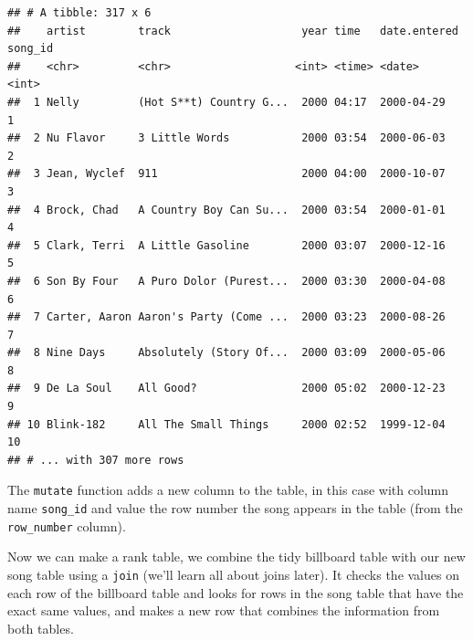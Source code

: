 \documentclass[12pt,]{book}
\newenvironment{Shaded}{\begin{snugshade}}{\end{snugshade}}
\newcommand{\KeywordTok}[1]{\textcolor[rgb]{0.13,0.29,0.53}{\textbf{#1}}}
\newcommand{\StringTok}[1]{\textcolor[rgb]{0.31,0.60,0.02}{#1}}
\newcommand{\OperatorTok}[1]{\textcolor[rgb]{0.81,0.36,0.00}{\textbf{#1}}}
\newcommand{\NormalTok}[1]{#1}
\theoremstyle{definition}
\theoremstyle{definition}
\theoremstyle{definition}
\theoremstyle{remark}
\begin{document}
\begin{verbatim}
## # A tibble: 317 x 6
##    artist        track                    year time   date.entered song_id
##    <chr>         <chr>                   <int> <time> <date>         <int>
##  1 Nelly         (Hot S**t) Country G...  2000 04:17  2000-04-29         1
##  2 Nu Flavor     3 Little Words           2000 03:54  2000-06-03         2
##  3 Jean, Wyclef  911                      2000 04:00  2000-10-07         3
##  4 Brock, Chad   A Country Boy Can Su...  2000 03:54  2000-01-01         4
##  5 Clark, Terri  A Little Gasoline        2000 03:07  2000-12-16         5
##  6 Son By Four   A Puro Dolor (Purest...  2000 03:30  2000-04-08         6
##  7 Carter, Aaron Aaron's Party (Come ...  2000 03:23  2000-08-26         7
##  8 Nine Days     Absolutely (Story Of...  2000 03:09  2000-05-06         8
##  9 De La Soul    All Good?                2000 05:02  2000-12-23         9
## 10 Blink-182     All The Small Things     2000 02:52  1999-12-04        10
## # ... with 307 more rows
\end{verbatim}

The \texttt{mutate} function adds a new column to the table, in this
case with column name \texttt{song\_id} and value the row number the
song appears in the table (from the \texttt{row\_number} column).

Now we can make a rank table, we combine the tidy billboard table with
our new song table using a \texttt{join} (we'll learn all about joins
later). It checks the values on each row of the billboard table and
looks for rows in the song table that have the exact same values, and
makes a new row that combines the information from both tables.

\begin{Shaded}
\end{Shaded}
\end{document}
